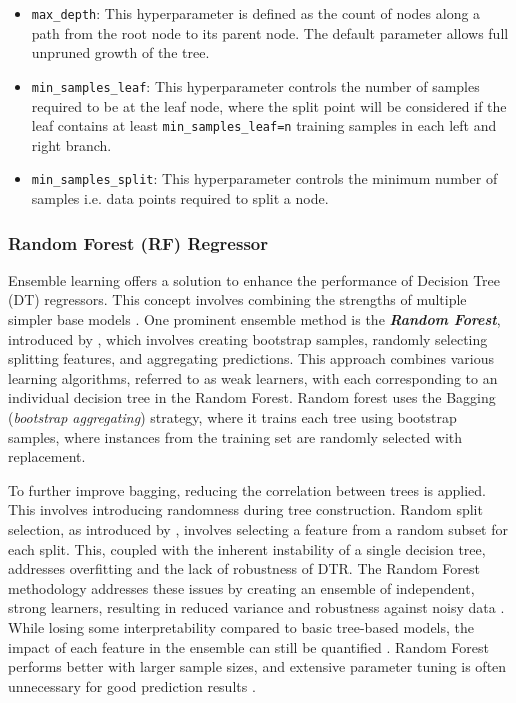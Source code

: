 \documentclass[]{interact}
\theoremstyle{plain}%
\theoremstyle{definition}
\theoremstyle{remark}
\begin{document}
\begin{itemize}
  \item \texttt{max\_depth}: This hyperparameter is defined as the count of nodes along a path from the root node to its parent node. The default parameter allows full unpruned growth of the tree.
  \item \texttt{min\_samples\_leaf}: This hyperparameter controls the number of samples required to be at the leaf node, where the split point will be considered if the leaf contains at least {\tt min\_samples\_leaf=n} training samples in each left and right branch.
  \item \texttt{min\_samples\_split}: This hyperparameter controls the minimum number of samples i.e. data points required to split a node.    
\end{itemize}

\subsubsection{Random Forest (RF) Regressor}\label{sec:rf_theo_j}

Ensemble learning offers a solution to enhance the performance of Decision Tree (DT) regressors. This concept involves combining the strengths of multiple simpler base models \citep{Hastie.2009}. One prominent ensemble method is the \textbf{\emph{Random Forest}}, introduced by \citet{Breiman.2001}, which involves creating bootstrap samples, randomly selecting splitting features, and aggregating predictions. This approach combines various learning algorithms, referred to as weak learners, with each corresponding to an individual decision tree in the Random Forest. Random forest uses the Bagging (\emph{bootstrap aggregating}) strategy, where it trains each tree using bootstrap samples, where instances from the training set are randomly selected with replacement.

To further improve bagging, reducing the correlation between trees is applied. This involves introducing randomness during tree construction. Random split selection, as introduced by \citet{Dietterich.2000}, involves selecting a feature from a random subset for each split. This, coupled with the inherent instability of a single decision tree, addresses overfitting and the lack of robustness of DTR. The Random Forest methodology addresses these issues by creating an ensemble of independent, strong learners, resulting in reduced variance and robustness against noisy data \citep{Breiman.2001}. While losing some interpretability compared to basic tree-based models, the impact of each feature in the ensemble can still be quantified \citep{Kuhn.2013}. Random Forest performs better with larger sample sizes, and extensive parameter tuning is often unnecessary for good prediction results \citep{Kuhn.2013, Hastie.2009}.
\end{document}
